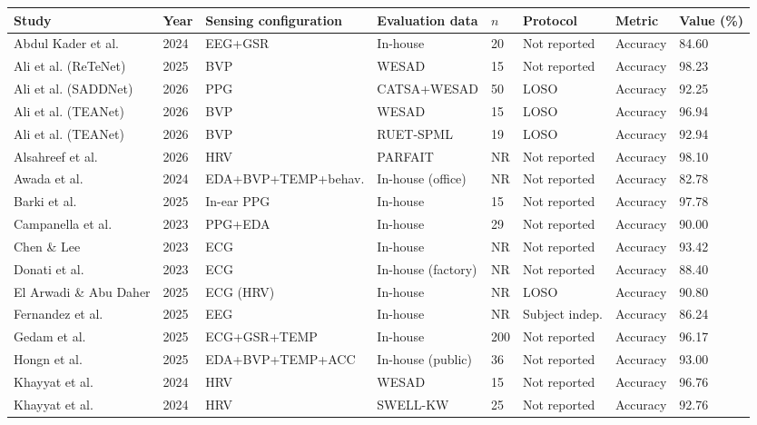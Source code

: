 \begin{tabular}{L{2.8cm} C{0.7cm} L{3.2cm} L{2.45cm} C{0.7cm} L{1.8cm} C{0.9cm} C{1.1cm}}
\toprule
\textbf{Study} & \textbf{Year} & \textbf{Sensing configuration} & \textbf{Evaluation data} & \textbf{$n$} & \textbf{Protocol} & \textbf{Metric} & \textbf{Value (\%)} \\
\midrule
Abdul Kader et al. \cite{r75} & 2024 & EEG+GSR & In-house & 20 & Not reported & Accuracy & 84.60 \\
Ali et al. (ReTeNet) \cite{r50} & 2025 & BVP & WESAD & 15 & Not reported & Accuracy & 98.23 \\
Ali et al. (SADDNet) \cite{r47} & 2026 & PPG & CATSA+WESAD & 50 & LOSO & Accuracy & 92.25 \\
Ali et al. (TEANet) \cite{r55} & 2026 & BVP & WESAD & 15 & LOSO & Accuracy & 96.94 \\
Ali et al. (TEANet) \cite{r55} & 2026 & BVP & RUET-SPML & 19 & LOSO & Accuracy & 92.94 \\
Alsahreef et al. \cite{r1} & 2026 & HRV & PARFAIT & NR & Not reported & Accuracy & 98.10 \\
Awada et al. \cite{r26} & 2024 & EDA+BVP+TEMP+behav. & In-house (office) & NR & Not reported & Accuracy & 82.78 \\
Barki et al. \cite{r43} & 2025 & In-ear PPG & In-house & 15 & Not reported & Accuracy & 97.78 \\
Campanella et al. \cite{r12} & 2023 & PPG+EDA & In-house & 29 & Not reported & Accuracy & 90.00 \\
Chen \& Lee \cite{r74} & 2023 & ECG & In-house & NR & Not reported & Accuracy & 93.42 \\
Donati et al. \cite{r5} & 2023 & ECG & In-house (factory) & NR & Not reported & Accuracy & 88.40 \\
El Arwadi \& Abu Daher \cite{r21} & 2025 & ECG (HRV) & In-house & NR & LOSO & Accuracy & 90.80 \\
Fernandez et al. \cite{r30} & 2025 & EEG & In-house & NR & Subject indep. & Accuracy & 86.24 \\
Gedam et al. \cite{r99} & 2025 & ECG+GSR+TEMP & In-house & 200 & Not reported & Accuracy & 96.17 \\
Hongn et al. \cite{r19} & 2025 & EDA+BVP+TEMP+ACC & In-house (public) & 36 & Not reported & Accuracy & 93.00 \\
Khayyat et al. \cite{r61} & 2024 & HRV & WESAD & 15 & Not reported & Accuracy & 96.76 \\
Khayyat et al. \cite{r61} & 2024 & HRV & SWELL-KW & 25 & Not reported & Accuracy & 92.76 \\

\end{tabular}
